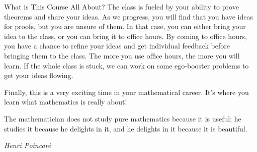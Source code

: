 \begin{section}{What is This Course All About?}
The class is fueled by your ability to prove theorems and share your ideas.  As we progress, you will find that you have ideas for proofs, but you are unsure of them.  In that case, you can either bring your idea to the class, or you can bring it to office hours.  By coming to office hours, you have a chance to refine your ideas and get individual feedback before bringing them to the class.  The more you use office hours, the more you will learn.  If the whole class is stuck, we can work on some ego-booster problems to get your ideas flowing.

Finally, this is a very exciting time in your mathematical career.  It's where you learn what mathematics is really about!

\epigraph{The mathematician does not study pure mathematics because it is useful; he studies it because he delights in it, and he delights in it because it is beautiful.}{\emph{Henri Poincar\'e}}

\end{section}

